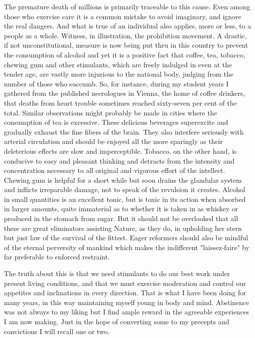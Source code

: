 \documentclass[a4paper,12pt,english,twoside,openright]{memoir}
\begin{document}
	The premature death of millions is primarily traceable to this cause.  Even among those who 
	exercise care it is a common mistake to avoid imaginary, and ignore the real dangers.  And what 
	is true of an individual also applies, more or less, to a people as a whole.  Witness, in illustration, 
	the prohibition movement.  A drastic, if not unconstitutional, measure is now being put thru in this 
	country to prevent the consumption of alcohol and yet it is a positive fact that coffee, tea, tobacco, 
	chewing gum and other stimulants, which are freely indulged in even at the tender age, are vastly 
	more injurious to the national body, judging from the number of those who succumb.  So, for 
	instance, during my student years I gathered from the published necrologues in Vienna, the home 
	of coffee drinkers, that deaths from heart trouble sometimes reached sixty-seven per cent of the 
	total.  Similar observations might probably be made in cities where the consumption of tea is 
	excessive.  These delicious beverages superexcite and gradually exhaust the fine fibers of the 
	brain.  They also interfere seriously with arterial circulation and should be enjoyed all the more 
	sparingly as their deleterious effects are slow and imperceptible.  Tobacco, on the other hand, is 
	conducive to easy and pleasant thinking and detracts from the intensity and concentration 
	necessary to all original and vigorous effort of the intellect.  Chewing gum is helpful for a short 
	while but soon drains the glandular system and inflicts irreparable damage, not to speak of the 
	revulsion it creates.  Alcohol in small quantities is an excellent tonic, but is toxic in its action when 
	absorbed in larger amounts, quite immaterial as to whether it is taken in as whiskey or produced 
	in the stomach from sugar.  But it should not be overlooked that all these are great eliminators 
	assisting Nature, as they do, in upholding her stern but just law of the survival of the fittest.  Eager 
	reformers should also be mindful of the eternal perversity of mankind which makes the indifferent 
	"laissez-faire" by far preferable to enforced restraint.  


	The truth about this is that we need stimulants to do our best work under present living 
	conditions, and that we must exercise moderation and control our appetites and inclinations in 
	every direction.  That is what I have been doing for many years, in this way maintaining myself 
	young in body and mind.  Abstinence was not always to my liking but I find ample reward in the 
	agreeable experiences I am now making.  Just in the hope of converting some to my precepts 
	and convictions I will recall one or two.  
	
\end{document}
